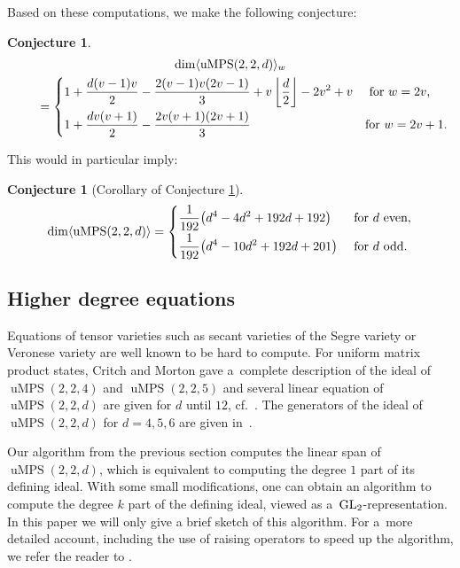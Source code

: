 \documentclass[10pt,a4paper]{amsart}
\numberwithin{equation}{section}
\newtheorem{Conjecture}[Theorem]{Conjecture}
\DeclareMathOperator{\uMPS}{uMPS}
\begin{document}
 Based on these computations, we make the following conjecture:

\begin{Conjecture}\label{conj: dim}
	\begin{gather*}
	\dim\langle \uMPS(2,2,d) \rangle_{w} \\
\qquad{} = \begin{cases}
	\displaystyle    1 + \frac{d(v-1)v}{2} - \frac{2(v-1)v(2v-1)}{3} + v\left\lfloor \frac{d}{2}\right\rfloor - 2v^2 + v & \text{ for $w = 2v$,} \vspace{1mm}\\
	 \displaystyle   1 + \frac{dv(v+1)}{2} - \frac{2v(v+1)(2v+1)}{3}             & \text{for $w = 2v+1$.}
	\end{cases}
	\end{gather*}
\end{Conjecture}

This would in particular imply:
\begin{Conjecture}[Corollary of Conjecture \ref{conj: dim}] \label{conj:dimcor}
\[
	\dim \langle \uMPS(2,2,d)\rangle = \begin{cases}
	\displaystyle\frac{1}{192}\big(d^4-4d^2+192d+192\big) & \text{ for $d$ even,}\vspace{1mm}\\
	\displaystyle\frac{1}{192}\big(d^4-10d^2+192d+201\big) & \text{ for $d$ odd.}
	\end{cases}
\]
\end{Conjecture}

\subsection{Higher degree equations}

Equations of tensor varieties such as secant varieties of the Segre variety or Veronese variety are well known to be hard to compute. For uniform matrix product states, Critch and Morton gave a~complete description of the ideal of $\uMPS(2,2,4)$ and $\uMPS(2,2,5)$ and several linear equation of $\uMPS(2,2,d)$ are given for $d$ until $12$, cf.~\cite{Critch2014AlgebraicGO}. The generators of the ideal of $\uMPS(2,2,d)$ for $d=4,5,6$ are given in~\cite{Czaplinski2019UniformMP}.

Our algorithm from the previous section computes the linear span of $\uMPS(2,2,d)$, which is equivalent to computing the degree $1$ part of its defining ideal. With some small modifications, one can obtain an algorithm to compute the degree $k$ part of the defining ideal, viewed as a~${\rm GL}_2$-representation. In this paper we will only give a brief sketch of this algorithm. For a~more detailed account, including the use of raising operators to speed up the algorithm, we refer the reader to \cite{ClaudiasThesis}.
\end{document}
